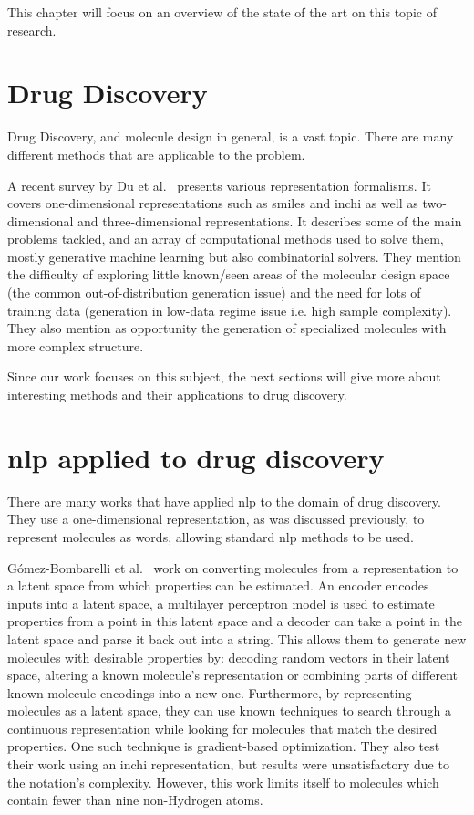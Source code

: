 \documentclass[../Document.tex]{subfiles}
\begin{document}
\label{chap:lit-review}

This chapter will focus on an overview of the state of the art on this topic of research.

\section{Drug Discovery}
Drug Discovery, and molecule design in general, is a vast topic.
There are many different methods that are applicable to the problem.

A recent survey by Du et al.~\cite{du2022molgensurvey} presents various representation formalisms. It covers one-dimensional representations such as \acrshort{smiles} and \acrshort{inchi} as well as two-dimensional and three-dimensional representations.
It describes some of the main problems tackled, and an array of computational methods used to solve them, mostly generative machine learning but also combinatorial solvers.
They mention the difficulty of exploring little known/seen areas of the molecular design space (the common out-of-distribution generation issue) and the need for lots of training data (generation in low-data regime issue i.e. high sample complexity).
They also mention as opportunity the generation of specialized molecules with more complex structure.

Since our work focuses on this subject, the next sections will give more about interesting methods and their applications to drug discovery.


\section{\acrshort{nlp} applied to drug discovery}
\label{sec:lit-review/nlp}
There are many works that have applied \gls{nlp} to the domain of drug discovery. They use a one-dimensional representation, as was discussed previously, to represent molecules as words, allowing standard \gls{nlp} methods to be used.

Gómez-Bombarelli et al.~\cite{gomez-bombarelli_automatic_2018} work on converting molecules from a \smiles representation to a latent space from which properties can be estimated. An encoder encodes \smiles inputs into a latent space, a multilayer perceptron model is used to estimate properties from a point in this latent space and a decoder can take a point in the latent space and parse it back out into a \smiles string.
This allows them to generate new molecules with desirable properties by: decoding random vectors in their latent space, altering a known molecule's representation or combining parts of different known molecule encodings into a new one.
Furthermore, by representing molecules as a latent space, they can use known techniques to search through a continuous representation while looking for molecules that match the desired properties.
One such technique is gradient-based optimization.
They also test their work using an \gls{inchi} representation, but results were unsatisfactory due to the notation's complexity.
However, this work limits itself to molecules which contain fewer than nine non-Hydrogen atoms.
\end{document}
